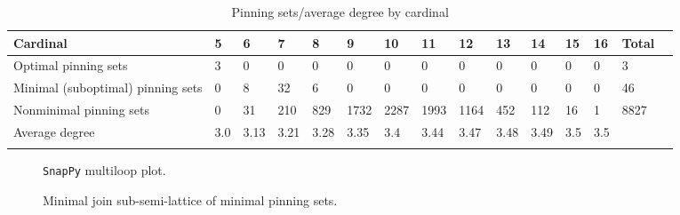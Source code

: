 \documentclass{article}%
\begin{document}
\begin{table}[ht]
	\caption{Pinning sets/average degree by cardinal}
	\centering
	\renewcommand{\arraystretch}{1.5}
	\begin{tabularx}{\textwidth}{lXXXXXXXXXXXXXX}
		\toprule
			Cardinal & 5 & 6 & 7 & 8 & 9 & 10 & 11 & 12 & 13 & 14 & 15 & 16 & Total\\
			\hline
			Optimal pinning sets & 3 & 0 & 0 & 0 & 0 & 0 & 0 & 0 & 0 & 0 & 0 & 0 & 3 \\
			Minimal (suboptimal) pinning sets & 0 & 8 & 32 & 6 & 0 & 0 & 0 & 0 & 0 & 0 & 0 & 0 & 46 \\
			Nonminimal pinning sets & 0 & 31 & 210 & 829 & 1732 & 2287 & 1993 & 1164 & 452 & 112 & 16 & 1 & 8827 \\
			Average degree & 3.0 & 3.13 & 3.21 & 3.28 & 3.35 & 3.4 & 3.44 & 3.47 & 3.48 & 3.49 & 3.5 & 3.5 &  \\
		\bottomrule \\ 
	\end{tabularx}
\end{table}

\begin{multicols}{2}
\begin{figure}[H]
\centering

\caption{\texttt{SnapPy} multiloop plot.}
\label{fig:tex/img/[[20, 28, 1, 21], [21, 6, 22, 5], [19, 12, 20, 13], [27, 11, 28, 12], [1, 11, 2, 10], [6, 16, 7, 15], [22, 15, 23, 14], [4, 13, 5, 14], [18, 3, 19, 4], [26, 2, 27, 3], [9, 25, 10, 26], [16, 25, 17, 24.svg}
\end{figure}
\columnbreak

\begin{figure}[H]
\centering
\scalebox{0.8}{}
\caption{Minimal join sub-semi-lattice of minimal pinning sets.}
\label{fig:tex/img/[[20, 28, 1, 21], [21, 6, 22, 5], [19, 12, 20, 13], [27, 11, 28, 12], [1, 11, 2, 10], [6, 16, 7, 15], [22, 15, 23, 14], [4, 13, 5, 14], [18, 3, 19, 4], [26, 2, 27, 3], [9, 25, 10, 26], [16, 25, 17, 24.pgf}
\end{figure}
\end{multicols}
\end{document}

